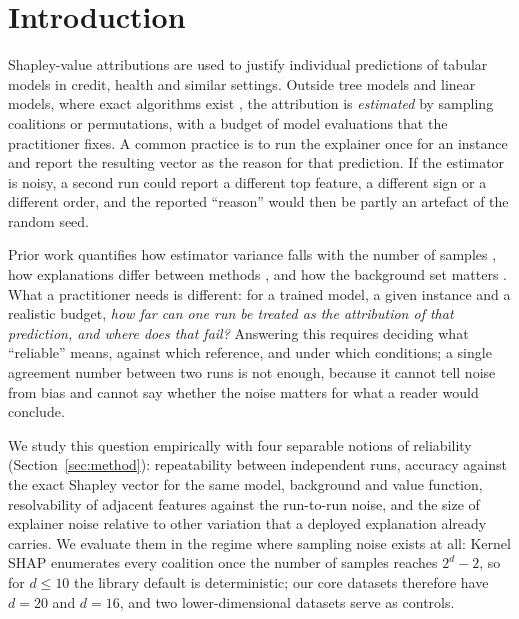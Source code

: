 \section{Introduction}
\label{sec:intro}
Shapley-value attributions \citep{lundberg2017unified} are used to justify individual predictions of tabular models in credit, health and similar settings. Outside tree models and linear models, where exact algorithms exist \citep{lundberg2020local}, the attribution is \emph{estimated} by sampling coalitions or permutations, with a budget of model evaluations that the practitioner fixes. A common practice is to run the explainer once for an instance and report the resulting vector as the reason for that prediction. If the estimator is noisy, a second run could report a different top feature, a different sign or a different order, and the reported ``reason'' would then be partly an artefact of the random seed.

Prior work quantifies how estimator variance falls with the number of samples \citep{covert2021improving,mitchell2022sampling,musco2025leverage}, how explanations differ between methods \citep{krishna2024disagreement}, and how the background set matters \citep{yuan2023background,chen2020true}. What a practitioner needs is different: for a trained model, a given instance and a realistic budget, \emph{how far can one run be treated as the attribution of that prediction, and where does that fail?} Answering this requires deciding what ``reliable'' means, against which reference, and under which conditions; a single agreement number between two runs is not enough, because it cannot tell noise from bias and cannot say whether the noise matters for what a reader would conclude.

We study this question empirically with four separable notions of reliability (Section~\ref{sec:method}): repeatability between independent runs, accuracy against the exact Shapley vector for the same model, background and value function, resolvability of adjacent features against the run-to-run noise, and the size of explainer noise relative to other variation that a deployed explanation already carries. We evaluate them in the regime where sampling noise exists at all: Kernel SHAP enumerates every coalition once the number of samples reaches $2^d-2$, so for $d\le10$ the library default is deterministic; our core datasets therefore have $d=20$ and $d=16$, and two lower-dimensional datasets serve as controls.

